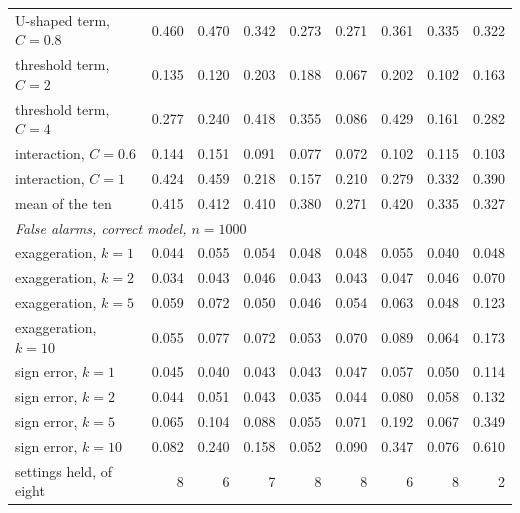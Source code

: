 \begin{table}[htbp]
{\begin{tabular}{lrrrrrrrr}
\quad U-shaped term, $C=0.8$ & 0.460 & 0.470 & 0.342 & 0.273 & 0.271 & 0.361 & 0.335 & 0.322 \\
\quad threshold term, $C=2$ & 0.135 & 0.120 & 0.203 & 0.188 & 0.067 & 0.202 & 0.102 & 0.163 \\
\quad threshold term, $C=4$ & 0.277 & 0.240 & 0.418 & 0.355 & 0.086 & 0.429 & 0.161 & 0.282 \\
\quad interaction, $C=0.6$ & 0.144 & 0.151 & 0.091 & 0.077 & 0.072 & 0.102 & 0.115 & 0.103 \\
\quad interaction, $C=1$ & 0.424 & 0.459 & 0.218 & 0.157 & 0.210 & 0.279 & 0.332 & 0.390 \\
\quad mean of the ten & 0.415 & 0.412 & 0.410 & 0.380 & 0.271 & 0.420 & 0.335 & 0.327 \\
\multicolumn{9}{l}{\emph{False alarms, correct model, $n=1000$}} \\
\quad exaggeration, $k=1$ & 0.044 & 0.055 & 0.054 & 0.048 & 0.048 & 0.055 & 0.040 & 0.048 \\
\quad exaggeration, $k=2$ & 0.034 & 0.043 & 0.046 & 0.043 & 0.043 & 0.047 & 0.046 & 0.070 \\
\quad exaggeration, $k=5$ & 0.059 & 0.072 & 0.050 & 0.046 & 0.054 & 0.063 & 0.048 & \cellcolor{black!12}0.123 \\
\quad exaggeration, $k=10$ & 0.055 & 0.077 & 0.072 & 0.053 & 0.070 & 0.089 & 0.064 & \cellcolor{black!12}0.173 \\
\quad sign error, $k=1$ & 0.045 & 0.040 & 0.043 & 0.043 & 0.047 & 0.057 & 0.050 & \cellcolor{black!12}0.114 \\
\quad sign error, $k=2$ & 0.044 & 0.051 & 0.043 & 0.035 & 0.044 & 0.080 & 0.058 & \cellcolor{black!12}0.132 \\
\quad sign error, $k=5$ & 0.065 & \cellcolor{black!12}0.104 & 0.088 & 0.055 & 0.071 & \cellcolor{black!12}0.192 & 0.067 & \cellcolor{black!12}0.349 \\
\quad sign error, $k=10$ & 0.082 & \cellcolor{black!12}0.240 & \cellcolor{black!12}0.158 & 0.052 & 0.090 & \cellcolor{black!12}0.347 & 0.076 & \cellcolor{black!12}0.610 \\
\quad settings held, of eight & 8 & 6 & 7 & 8 & 8 & 6 & 8 & 2 \\
\hline\end{tabular}}\end{table}

